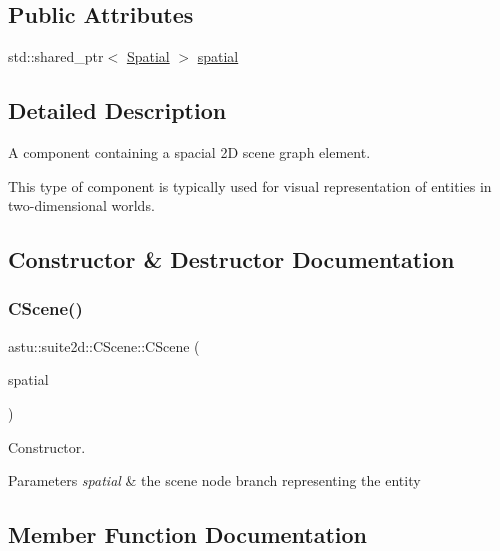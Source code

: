 \subsection*{Public Attributes}
\begin{DoxyCompactItemize}
\item 
std\+::shared\+\_\+ptr$<$ \hyperlink{classastu_1_1suite2d_1_1Spatial}{Spatial} $>$ \hyperlink{classastu_1_1suite2d_1_1CScene_af8b497f2d0dac0c1bb4d7d3038280189}{spatial}
\end{DoxyCompactItemize}


\subsection{Detailed Description}
A component containing a spacial 2D scene graph element.

This type of component is typically used for visual representation of entities in two-\/dimensional worlds. 

\subsection{Constructor \& Destructor Documentation}
\mbox{\label{classastu_1_1suite2d_1_1CScene_afdee9d9f1214ccfd36b44f68d5e351fa}} 
\subsubsection{\texorpdfstring{C\+Scene()}{CScene()}}
{\footnotesize\ttfamily astu\+::suite2d\+::\+C\+Scene\+::\+C\+Scene (\begin{DoxyParamCaption}\item[{std\+::shared\+\_\+ptr$<$ \hyperlink{classastu_1_1suite2d_1_1Spatial}{Spatial} $>$}]{spatial }\end{DoxyParamCaption})\hspace{0.3cm}{\ttfamily [inline]}}

Constructor.


\begin{DoxyParams}{Parameters}
{\em spatial} & the scene node branch representing the entity \\
\hline
\end{DoxyParams}


\subsection{Member Function Documentation}
\mbox{\label{classastu_1_1suite2d_1_1CScene_ae8dad316175ec4bbfbdb7fff3c736cd3}} 
